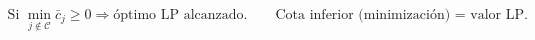 \documentclass[preview]{standalone}
\begin{document}
\begin{align*}
\text{Si } \min_{j\notin\mathcal{C}} \bar{c}_j \ge 0 \Rightarrow \text{óptimo LP alcanzado.} \qquad \text{Cota inferior (minimización) = valor LP.}
\end{align*}
\end{document}
